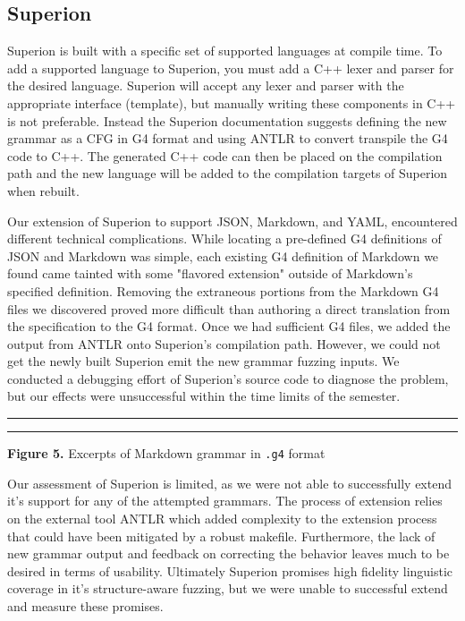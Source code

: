 \documentclass[12pt]{diazessay}
\begin{document}
\subsection*{Superion}

Superion is built with a specific set of supported languages at compile time.
To add a supported language to Superion, you must add a C++ lexer and parser for the desired language.
Superion will accept any lexer and parser with the appropriate interface (template), but manually writing these components in C++ is not preferable.
Instead the Superion documentation suggests defining the new grammar as a CFG in G4 format and using ANTLR\cite{parr2013definitive} to convert transpile the G4 code to C++.
The generated C++ code can then be placed on the compilation path and the new language will be added to the compilation targets of Superion when rebuilt.

Our extension of Superion to support JSON, Markdown, and YAML, encountered different technical complications.
While locating a pre-defined G4 definitions of JSON and Markdown was simple, each existing G4 definition of Markdown we found came tainted with some "flavored extension" outside of Markdown's specified definition.
Removing the extraneous portions from the Markdown G4 files we discovered proved more difficult than authoring a direct translation from the specification to the G4 format.
Once we had sufficient G4 files, we added the output from ANTLR onto Superion's compilation path.
However, we could not get the newly built Superion emit the new grammar fuzzing inputs.
We conducted a debugging effort of Superion's source code to diagnose the problem, but our effects were unsuccessful within the time limits of the semester.

\vspace{10mm}
\hrule height 0.4mm
\begingroup \fontsize{10pt}{10pt} \selectfont 
\begin{alltt}

\end{alltt} \vspace{-6mm} \endgroup \hrule height 0.4mm
\vspace{6mm}
\centerline{\textbf{Figure 5.} Excerpts of Markdown grammar in \texttt{.g4} format}
\vspace{6mm}

Our assessment of Superion is limited, as we were not able to successfully extend it's support for any of the attempted grammars.
The process of extension relies on the external tool ANTLR which added complexity to the extension process that could have been mitigated by a robust makefile.
Furthermore, the lack of new grammar output and feedback on correcting the behavior leaves much to be desired in terms of usability.
Ultimately Superion promises high fidelity linguistic coverage in it's structure-aware fuzzing, but we were unable to successful extend and measure these promises.
\end{document}
